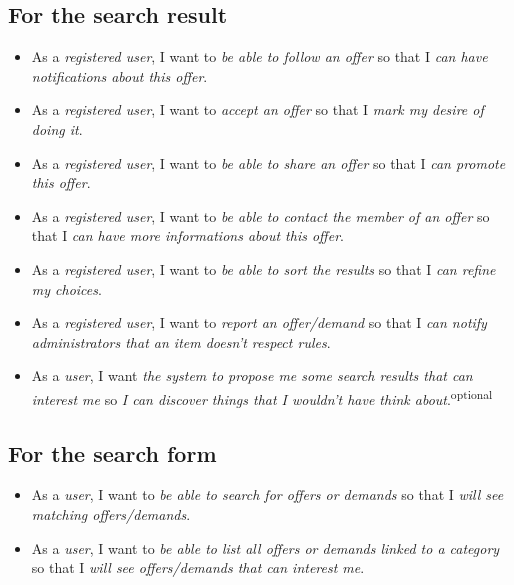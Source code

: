 \subsection{For the search result}
\begin{itemize}
    \item As a \textit{registered user}, I want to \textit{be able to follow an offer} so that I \textit{can have notifications about this offer}.
    \item As a \textit{registered user}, I want to \textit{accept an offer} so that I \textit{mark my desire of doing it}.
    \item As a \textit{registered user}, I want to \textit{be able to share an offer} so that I \textit{can promote this offer}.
    \item As a \textit{registered user}, I want to \textit{be able to contact the member of an offer} so that I \textit{can have more informations about this offer}.
    \item As a \textit{registered user}, I want to \textit{be able to sort the results} so that I \textit{can refine my choices}.
    \item As a \textit{registered user}, I want to \textit{report an offer/demand} so that I \textit{can notify administrators that an item doesn't respect rules}.
    \item As a \textit{user}, I want \textit{the system to propose me some search results that can interest me} so \textit {I can discover things that I wouldn't have think about}.\textsuperscript{optional}
\end{itemize}

\subsection{For the search form}
\begin{itemize}
    \item As a \textit{user}, I want to \textit{be able to search for offers or demands} so that I \textit{will see matching offers/demands}.
    \item As a \textit{user}, I want to \textit{be able to list all offers or demands linked to a category} so that I \textit{will see offers/demands that can interest me}.
\end{itemize}

